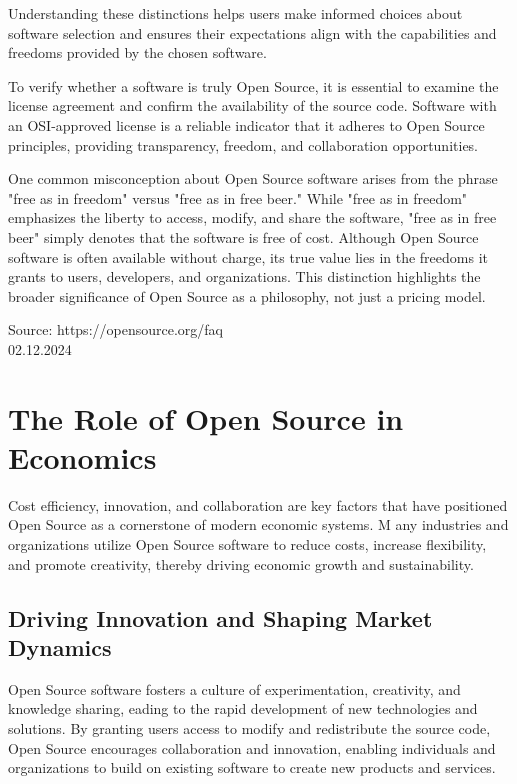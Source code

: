 Understanding these distinctions helps users make informed choices about software selection and ensures their expectations align with the capabilities and freedoms provided by the chosen software.

To verify whether a software is truly Open Source, it is essential to examine the license agreement and confirm the availability of the source code. 
Software with an OSI-approved license is a reliable indicator that it adheres to Open Source principles, providing transparency, freedom, and collaboration opportunities.

One common misconception about Open Source software arises from the phrase "free as in freedom" versus "free as in free beer."  
While "free as in freedom" emphasizes the liberty to access, modify, and share the software, "free as in free beer" simply denotes that the software is free of cost. 
Although Open Source software is often available without charge, its true value lies in the freedoms it grants to users, developers, and organizations. 
This distinction highlights the broader significance of Open Source as a philosophy, not just a pricing model.


Source: https://opensource.org/faq \\ 02.12.2024

\section{The Role of Open Source in Economics}

Cost efficiency, innovation, and collaboration are key factors that have positioned Open Source as a cornerstone of modern economic systems. M
any industries and organizations utilize Open Source software to reduce costs, increase flexibility, 
and promote creativity, thereby driving economic growth and sustainability.

\subsection{Driving Innovation and Shaping Market Dynamics}

Open Source software fosters a culture of experimentation, creativity, and knowledge sharing, 
eading to the rapid development of new technologies and solutions. By granting users access to modify and redistribute the source code, 
Open Source encourages collaboration and innovation, enabling individuals and organizations to build on existing software to create new products and services.

